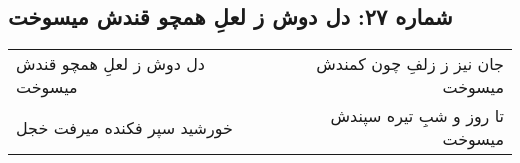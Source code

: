 \begin{center}
\section*{شماره ۲۷: دل دوش ز لعلِ همچو قندش میسوخت}
\label{sec:027}
\begin{longtable}{l p{0.5cm} r}
دل دوش ز لعلِ همچو قندش میسوخت
&&
جان نیز ز زلفِ چون کمندش میسوخت
\\
خورشید سپر فکنده میرفت خجل
&&
تا روز و شبِ تیره سپندش میسوخت
\\
\end{longtable}
\end{center}
